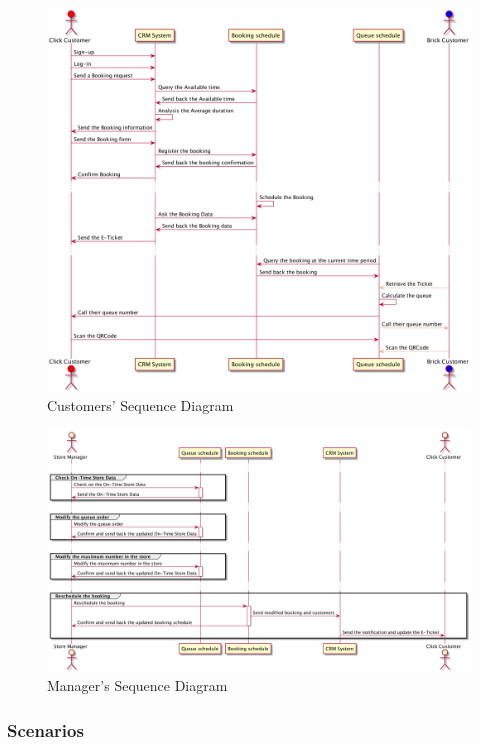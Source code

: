 \documentclass[a4paper,12pt]{report}
\begin{document}
\begin{figure}
	\includegraphics[scale=0.22]{sequence_diagram_customer.png}
	\centering
	\caption{Customers' Sequence Diagram}
	\label{Sequence Diagram Customer}
\end{figure}

\begin{figure}
	\includegraphics[scale=0.18]{sequence_diagram_manager.png}
	\centering
	\caption{Manager's Sequence Diagram}
	\label{Sequence Diagram Manager}
\end{figure}


\subsubsection{Scenarios}
\end{document}
